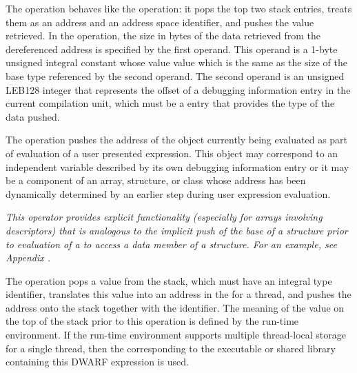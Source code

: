 \begin{enumerate}[1. ]
\itembfnl{\DWOPxdereftypeTARG}
The \DWOPxdereftypeNAME{} operation behaves like the \DWOPxderefsize{}
operation: it pops the top two stack entries, treats them as an address and
an address space identifier, and pushes the value retrieved. In the
\DWOPxdereftypeNAME{} operation, the size in bytes of the data retrieved from
the dereferenced address is specified by the first operand. This operand is
a 1-byte unsigned integral constant whose value 
value which is the same as the size of the base type referenced
by the second operand. The second
operand is an unsigned LEB128 integer that represents the offset of a
debugging information entry in the current compilation unit, which must be a
\DWTAGbasetype{} entry that provides the type of the data pushed.

\itembfnl{\DWOPpushobjectaddressTARG}
The \DWOPpushobjectaddressNAME{}
operation pushes the address
of the object currently being evaluated as part of evaluation
of a user presented expression. This object may correspond
to an independent variable described by its own debugging
information entry or it may be a component of an array,
structure, or class whose address has been dynamically
determined by an earlier step during user expression
evaluation.

\textit{This operator provides explicit functionality
(especially for arrays involving descriptors) that is analogous
to the implicit push of the base 
of a structure prior to evaluation of a 
\DWATdatamemberlocation{} 
to access a data member of a structure. For an example, see 
Appendix .}

\itembfnl{\DWOPformtlsaddressTARG}
The \DWOPformtlsaddressNAME{} 
operation pops a value from the stack, which must have an 
integral type identifier, translates this
value into an address in the 
for a thread, and pushes the address 
onto the stack together with the \generictype{} identifier. 
The meaning of the value on the top of the stack prior to this 
operation is defined by the run-time environment.  If the run-time 
environment supports multiple thread-local storage 
 for a single thread, then the  
corresponding to the executable or shared 
library containing this DWARF expression is used.
   

\end{enumerate}
